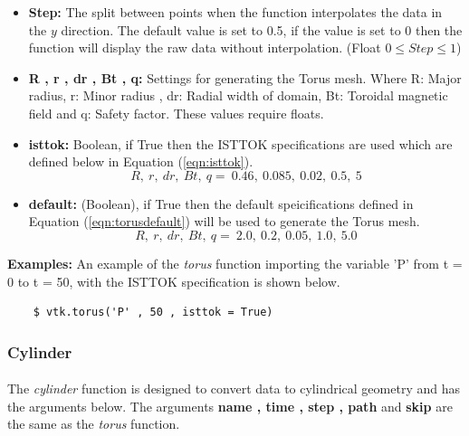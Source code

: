 \documentclass[12pt,a4paper]{article}
\begin{document}
	\begin{itemize}
		\item{\textbf{Step:}
			The split between points when the function interpolates the data in the $y$ direction. The default value is set to 0.5, if the value is set to 0 then the function will display the raw data without interpolation. (Float $0\leq Step \leq 1 $)}
		\item{\textbf{R , r , dr , Bt , q:}
			Settings for generating the Torus mesh. Where R: Major radius, r: Minor radius , dr: Radial width of domain, Bt: Toroidal magnetic field and q: Safety factor. These values require floats.}
		\item{\textbf{isttok:}
			Boolean, if True then the ISTTOK specifications are used which are defined below in Equation (\ref{eqn:isttok}).
			\begin{equation}
				\label{eqn:isttok}
				R ,\ r ,\ dr ,\ Bt ,\ q = \ 0.46 ,\ 0.085 ,\ 0.02 , \ 0.5 , \ 5 
			\end{equation}}
		\item{\textbf{default:} (Boolean), if True then the default speicifications defined in Equation (\ref{eqn:torusdefault}) will be used to generate the Torus mesh.
			\begin{equation}
				\label{eqn:torusdefault}
				R ,\ r ,\ dr ,\ Bt ,\ q = \ 2.0 ,\ 0.2 ,\ 0.05 , \ 1.0 , \ 5.0
			\end{equation}}
	\end{itemize}

	\textbf{Examples:} An example of the \textit{torus} function importing the variable 'P' from t = 0 to t = 50, with the ISTTOK specification is shown below.
	
	\begin{verbatim}
	$ vtk.torus('P' , 50 , isttok = True)
	\end{verbatim}
	
		
	
	\subsubsection{Cylinder}
	\label{sec:cylinder_scalar}
	\paragraph{}
	The \textit{cylinder} function is designed to convert data to cylindrical geometry and has the arguments below. The arguments \textbf{name , time , step , path} and \textbf{skip} are the same as the \textit{torus} function.
	
\end{document}
